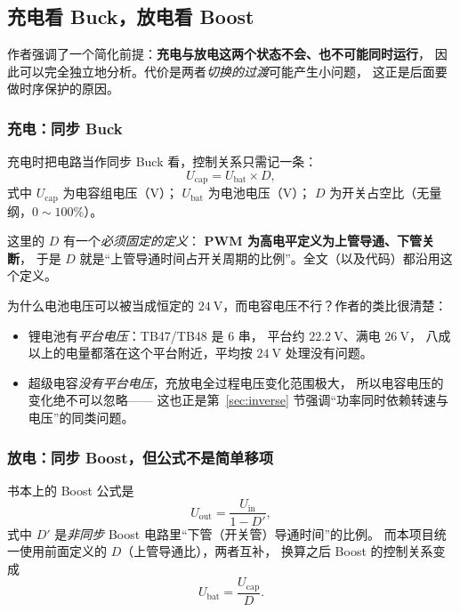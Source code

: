 \documentclass[cn,blue,11pt,device=normal]{elegantnote}
\begin{document}
\subsection{充电看 Buck，放电看 Boost}

作者强调了一个简化前提：\textbf{充电与放电这两个状态不会、也不可能同时运行}，
因此可以完全独立地分析。代价是两者\emph{切换的过渡}可能产生小问题，
这正是后面要做时序保护的原因。

\subsubsection{充电：同步 Buck}

充电时把电路当作同步 Buck 看，控制关系只需记一条：
\begin{equation}\label{eq:capbuck}
  U_{\mathrm{cap}} = U_{\mathrm{bat}}\times D ,
\end{equation}
式中 $U_{\mathrm{cap}}$ 为电容组电压（V）；
$U_{\mathrm{bat}}$ 为电池电压（V）；
$D$ 为开关占空比（无量纲，$0\sim100\%$）。

这里的 $D$ 有一个\emph{必须固定的定义}：
\textbf{PWM 为高电平定义为上管导通、下管关断}，
于是 $D$ 就是“上管导通时间占开关周期的比例”。全文（以及代码）都沿用这个定义。

为什么电池电压可以被当成恒定的 $24\ \mathrm{V}$，而电容电压不行？作者的类比很清楚：

\begin{itemize}
  \item 锂电池有\emph{平台电压}：TB47/TB48 是 $6$ 串，
  平台约 $22.2\ \mathrm{V}$、满电 $26\ \mathrm{V}$，
  八成以上的电量都落在这个平台附近，平均按 $24\ \mathrm{V}$ 处理没有问题。
  \item 超级电容\emph{没有平台电压}，充放电全过程电压变化范围极大，
  所以电容电压的变化绝不可以忽略——
  这也正是第~\ref{sec:inverse} 节强调“功率同时依赖转速与电压”的同类问题。
\end{itemize}

\subsubsection{放电：同步 Boost，但公式不是简单移项}

书本上的 Boost 公式是
\begin{equation}\label{eq:boosttextbook}
  U_{\mathrm{out}} = \frac{U_{\mathrm{in}}}{1-D'},
\end{equation}
式中 $D'$ 是\emph{非同步} Boost 电路里“下管（开关管）导通时间”的比例。
而本项目统一使用前面定义的 $D$（上管导通比），两者互补，
换算之后 Boost 的控制关系变成
\begin{equation}\label{eq:capboost}
  U_{\mathrm{bat}} = \frac{U_{\mathrm{cap}}}{D} .
\end{equation}
\end{document}
